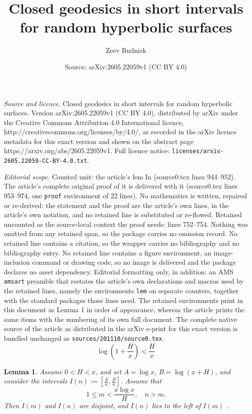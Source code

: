 \documentclass[10pt,a4paper]{amsart}
\title{Closed geodesics in short intervals for random hyperbolic surfaces}
\author{Zeev Rudnick}
\date{Source: arXiv:2605.22059v1 (CC BY 4.0)}
\newtheorem{lem}{Lemma}
\begin{document}
\maketitle

\noindent\emph{Source and licence.} Closed geodesics in short intervals for random hyperbolic surfaces. Version arXiv:2605.22059v1 (CC BY 4.0), distributed by arXiv under the Creative Commons Attribution 4.0 International licence, http://creativecommons.org/licenses/by/4.0/, as recorded in the arXiv licence metadata for this exact version and shown on the abstract page https://arxiv.org/abs/2605.22059v1. Full licence notice: \texttt{licenses/arxiv-2605.22059-CC-BY-4.0.txt}.\par\smallskip

\noindent\textit{Editorial scope.} Counted unit: the article's lem In (source0.tex lines 944--952). The article's complete original proof of it is delivered with it (source0.tex lines 953--974, one \texttt{proof} environment of 22 lines). No mathematics is written, repaired or re-derived: the statement and the proof are the article's own lines, in the article's own notation, and no retained line is substituted or re-flowed.  Retained uncounted as the source-local context the proof needs: lines 752--754.  Nothing was omitted from any retained span, so the package carries no omission record.  No retained line contains a citation, so the wrapper carries no bibliography and no bibliography entry.  No retained line contains a figure environment, an image-inclusion command or drawing code, so no image is delivered and the package declares no asset dependency.  Editorial formatting only, in addition: an AMS \texttt{amsart} preamble that restates the article's own declarations and macros used by the retained lines, namely the environments \texttt{lem} on separate counters, together with the standard packages those lines need.  The retained environments print in this document as Lemma 1 in order of appearance, whereas the article prints the same items with the numbering of its own full document.  The complete native source of the article as distributed in the arXiv e-print for this exact version is bundled unchanged as \texttt{sources/201110/source0.tex}.
\begin{equation}\label{eq:log 1+H x}
\log \left( 1+\frac Hx \right) < \frac Hx
\end{equation}

\begin{lem}\label{lem:disjoint In} 
Assume  $0 < H < x$,  and set $A = \log x$, $B =\log(x+H)$, and consider the intervals $I(n):=[\frac An,\frac Bn]$.    
Assume that 
$$1 \le m <  \frac{x\log x}{H}, \quad n>m.
$$  %
Then $I(m)$ and $I(n)$ are disjoint, and $I(n)$ lies to the left of $I(m)$ .
\end{lem}  
\end{document}
